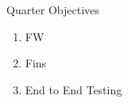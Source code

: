 \begin{frame}{Quarter Objectives}
    \begin{enumerate}
        \item FW
        \item Fins
        \item End to End Testing
    \end{enumerate}
\end{frame}

